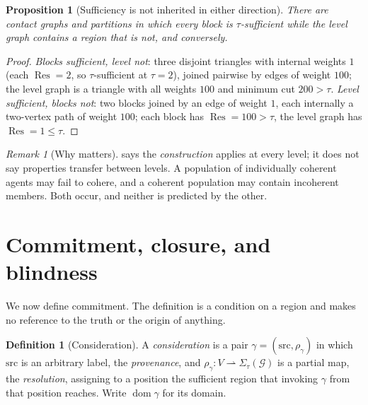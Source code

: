 \documentclass[11pt,a4paper]{article}
\theoremstyle{clstyle}
\newtheorem{proposition}[theorem]{Proposition}
\theoremstyle{definition}
\newtheorem{definition}[theorem]{Definition}
\theoremstyle{remark}
\newtheorem{remark}[theorem]{Remark}
\DeclareMathOperator{\Res}{Res}
\DeclareMathOperator{\dom}{dom}
\newcommand{\Gph}{\mathcal{G}}
\newcommand{\V}{V}
\newcommand{\Sig}{\Sigma}
\begin{document}
\begin{proposition}[Sufficiency is not inherited in either direction]
\label{prop:not-inherited}
There are contact graphs and partitions in which every block is
$\tau$-sufficient while the level graph contains a region that is not, and
conversely.
\end{proposition}

\begin{proof}
\emph{Blocks sufficient, level not}: three disjoint triangles with internal
weights $1$ (each $\Res=2$, so $\tau$-sufficient at $\tau=2$), joined
pairwise by edges of weight $100$; the level graph is a triangle with all
weights $100$ and minimum cut $200>\tau$. \emph{Level sufficient, blocks
not}: two blocks joined by an edge of weight $1$, each internally a
two-vertex path of weight $100$; each block has $\Res=100>\tau$, the level
graph has $\Res=1\le\tau$.
\end{proof}

\begin{remark}[Why  matters]
\label{rem:not-inherited}
 says the \emph{construction} applies at every level; it
does not say properties transfer between levels. A population of
individually coherent agents may fail to cohere, and a coherent population
may contain incoherent members. Both occur, and neither is predicted by the
other.
\end{remark}

\section{Commitment, closure, and blindness}
\label{sec:closure}

We now define commitment. The definition is a condition on a region and
makes no reference to the truth or the origin of anything.

\begin{definition}[Consideration]
\label{def:catalyst}
A \emph{consideration} is a pair $\gamma=(\mathrm{src},\rho_\gamma)$ in
which $\mathrm{src}$ is an arbitrary label, the \emph{provenance}, and
$\rho_\gamma:\V\rightharpoonup\Sig_\tau(\Gph)$ is a partial map, the
\emph{resolution}, assigning to a position the sufficient region that
invoking $\gamma$ from that position reaches. Write $\dom\gamma$ for its
domain.
\end{definition}
\end{document}
